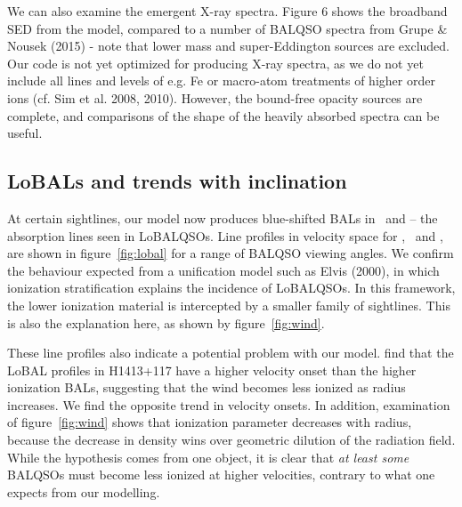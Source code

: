 \documentclass[useAMS,usenatbib]{mn2e_x}
\begin{document}
We can also examine the emergent X-ray spectra. 
Figure 6 shows the broadband SED from the model, compared to a number of BALQSO spectra
from Grupe \& Nousek (2015) - note that lower mass and super-Eddington sources
are excluded. Our code is not yet optimized for producing X-ray spectra, as we do not yet 
include all lines and levels of e.g. Fe or macro-atom treatments of 
higher order ions (cf. Sim et al. 2008, 2010). 
However, the bound-free opacity sources are complete, and comparisons of the shape
of the heavily absorbed spectra can be useful.








\subsection{LoBALs and trends with inclination}

At certain sightlines, our model now produces blue-shifted BALs in \al\ and \mg --
the absorption lines seen in LoBALQSOs. Line profiles in velocity space 
for \civ, \al\ and \mg, are shown in figure~\ref{fig:lobal} for a range
of BALQSO viewing angles. We confirm the behaviour expected from 
a unification model such as Elvis (2000), in which ionization stratification
explains the incidence of LoBALQSOs. In this framework, the lower
ionization material is intercepted by a smaller family of sightlines.
This is also the explanation here, as shown by figure~\ref{fig:wind}.

These line profiles also indicate a potential problem with our model. 
\cite{odowd2015} find that the LoBAL profiles in H1413+117 have a 
higher velocity onset than the higher ionization BALs, suggesting that the
wind becomes less ionized as radius increases. 
We find the opposite trend in velocity onsets. In addition, examination of 
figure~\ref{fig:wind} shows that ionization parameter decreases with radius, 
because the decrease in density wins over geometric dilution of the radiation 
field. While the \cite{odowd2015} hypothesis comes from one object,
it is clear that {\em at least some} BALQSOs must become less ionized at 
higher velocities, contrary to what one expects from our modelling.
\end{document}
